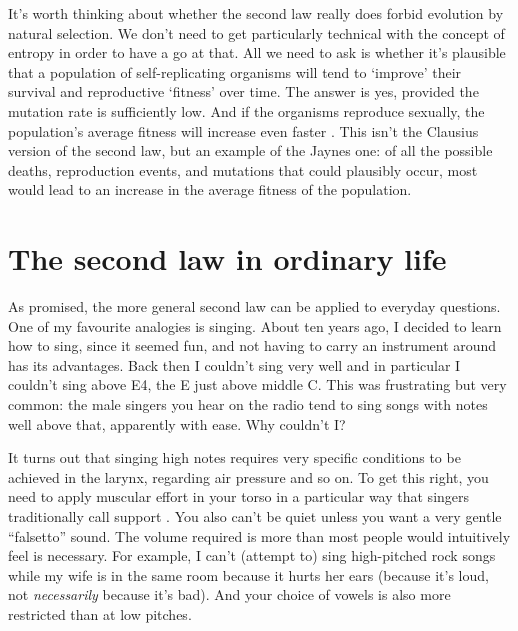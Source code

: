 \documentclass[a4paper, 12pt]{article}
\begin{document}

It's worth thinking about whether the second law really does forbid evolution
by natural selection. We don't need to get particularly technical with the
concept of entropy in order to have a go at that. All we need to ask is whether
it's plausible that a population of self-replicating organisms will tend to
`improve' their survival and reproductive `fitness' over time.
The answer is yes, provided the mutation rate is sufficiently
low. And if the organisms reproduce sexually, the population's average fitness
will increase even faster \citep{mackay}. This isn't the Clausius version of
the second law, but an example of the Jaynes one: of all the possible deaths,
reproduction events, and mutations that could plausibly occur, most would lead to
an increase in the average fitness of the population.

\section*{The second law in ordinary life}
As promised, the more general second law can be applied to everyday questions.
One of my favourite analogies is singing. About ten years ago, I decided to
learn how to sing, since it seemed fun, and not having to carry an instrument
around has its advantages. Back then I couldn't sing very well and in particular
I couldn't sing above E4, the E just above middle C. This was frustrating but
very common: the male singers you hear on the radio tend to sing songs with
notes well above that, apparently with ease. Why couldn't I?

It turns out that singing high notes requires very specific conditions to be
achieved in the larynx, regarding air pressure and so on. To get this right,
you need to apply muscular effort in your torso in a particular way that singers
traditionally call support \citep{cvt}. You also can't be quiet unless you want
a very gentle ``falsetto'' sound. The volume required is more than most people
would intuitively feel is necessary. For example, I can't (attempt to)
sing high-pitched
rock songs while my wife is in the same room because it hurts her ears
(because it's loud, not {\em necessarily} because it's bad). And
your choice of vowels is also more restricted than at low pitches.
\end{document}
